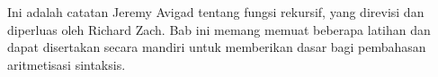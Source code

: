 \documentclass[../../../include/open-logic-chapter]{subfiles}
\begin{document}

\begin{editorial}
  Ini adalah catatan Jeremy Avigad tentang fungsi rekursif, yang direvisi dan
  diperluas oleh Richard Zach. Bab ini memang memuat beberapa latihan dan
  dapat disertakan secara mandiri untuk memberikan dasar bagi pembahasan
  aritmetisasi sintaksis.
\end{editorial}





















\OLEndChapterHook
\end{document}
